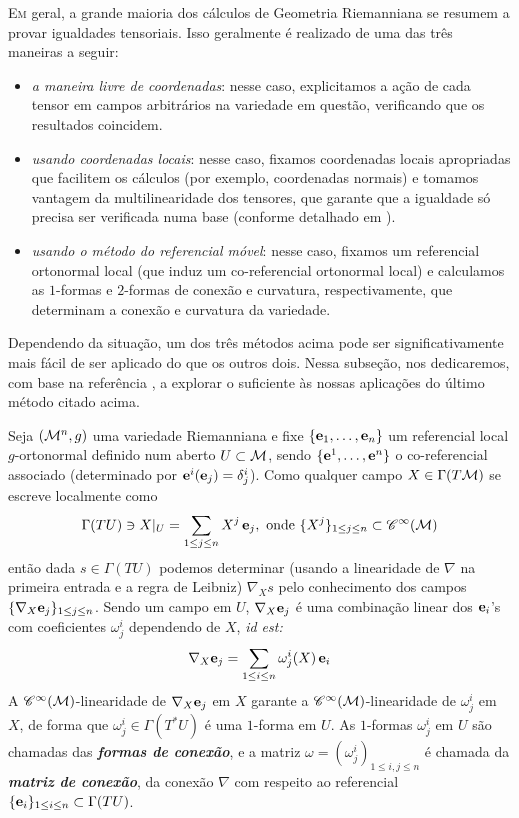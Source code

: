 \lettrine[nindent=2em,lines=1]{E}m geral, a grande maioria dos cálculos de Geometria Riemanniana se resumem a provar igualdades tensoriais. Isso geralmente é realizado de uma das três maneiras a seguir:
\begin{itemize}
\item \emph{a maneira livre de coordenadas}: nesse caso, explicitamos a ação de cada tensor em campos arbitrários na variedade em questão, verificando que os resultados coincidem.
\item \emph{usando coordenadas locais}: nesse caso, fixamos coordenadas locais apropriadas que facilitem os cálculos (por exemplo, coordenadas normais) e tomamos vantagem da multilinearidade dos tensores, que garante que a igualdade só precisa ser verificada numa base (conforme detalhado em ). 
\item \emph{usando o método do referencial móvel}: nesse caso, fixamos um referencial ortonormal local (que induz um co-referencial ortonormal local) e calculamos as $1$-formas e $2$-formas de conexão e curvatura, respectivamente, que determinam a conexão e curvatura da variedade.
\end{itemize}
Dependendo da situação, um dos três métodos acima pode ser significativamente mais fácil de ser aplicado do que os outros dois. Nessa subseção, nos dedicaremos, com base na referência , a explorar o suficiente às nossas aplicações do último método citado acima. \par 
Seja $(\mathcal{M}^n, g)$ uma variedade Riemanniana e fixe $\{\mathbf{e}_1, \ldots, \mathbf{e}_n \}$ um referencial local $g$-ortonormal definido num aberto $U \subset \mathcal{M}$, sendo $\{\mathbf{e}^1, \ldots, \mathbf{e}^n\}$ o co-referencial associado (determinado por $\mathbf{e}^i(\mathbf{e}_j) = \delta^i_j$). Como qualquer campo $X \in \Gamma(T \mathcal{M})$ se escreve localmente como \[\Gamma(TU) \ni  X|_{U} = \sum_{1 \leq j \leq n} X^j \, \mathbf{e}_j, \text{ onde } \{ X^j \}_{1 \leq j \leq n} \subset \mathscr{C}^{\infty}(\mathcal{M}) \] então dada $s \in \Gamma(TU)$ podemos determinar (usando a linearidade de $\nabla$ na primeira entrada e a regra de Leibniz) $\nabla_X s$ pelo conhecimento dos campos $\{\nabla_X \mathbf{e}_j \}_{1 \leq j \leq n}$. Sendo um campo em $U$, $\nabla_X \mathbf{e}_j$ é uma combinação linear dos $\mathbf{e}_i$'s com coeficientes $\omega^{i}_j$ dependendo de $X$, \emph{id est:}
\[ 
\nabla_X \mathbf{e}_j = \sum_{1 \leq i \leq n} \omega^{i}_j(X) \, \mathbf{e}_i
\]
A $\mathscr{C}^{\infty}(\mathcal{M})$-linearidade de $\nabla_X \mathbf{e}_j$ em $X$ garante a $\mathscr{C}^{\infty}(\mathcal{M})$-linearidade de $\omega^{i}_j$ em $X$, de forma que $\omega^{i}_j \in \Gamma(T^{*} U)$ é uma $1$-forma em $U$. As $1$-formas $\omega^{i}_j$ em $U$ são chamadas das \textbf{\emph{formas de conexão}}, e a matriz $\omega = (\omega^{i}_j)_{1 \leq i, j \leq n}$ é chamada da \textbf{\emph{matriz de conexão}}, da conexão $\nabla$ com respeito ao referencial $\{\mathbf{e}_i \}_{1 \leq i \leq n} \subset \Gamma(T U)$. \par 
